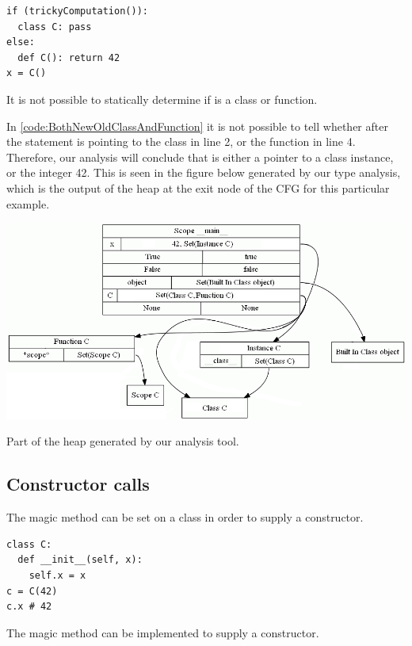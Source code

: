 \begin{listing}[H]
	\begin{verbatim}
if (trickyComputation()):
  class C: pass
else:
  def C(): return 42
x = C()
	\end{verbatim}
	\caption{It is not possible to statically determine if  is a class or function.}
	\label{code:BothNewOldClassAndFunction}
\end{listing}

In \autoref{code:BothNewOldClassAndFunction} it is not possible to tell whether  after the  statement is pointing to the class in line 2, or the function in line 4. Therefore, our analysis will conclude that  is either a pointer to a class instance, or the integer 42. This is seen in the figure below generated by our type analysis, which is the output of the heap at the exit node of the CFG for this particular example.

\begin{listing}[H]
	\begin{center}
		\includegraphics[width=1\textwidth]{images/BothNewOldClassAndFunction.png}
	\end{center}
	\vspace{-10pt}
	\caption{Part of the heap generated by our analysis tool.}
	\label{fig:BothNewOldClassAndFunction}
\end{listing}


\subsection{Constructor calls}
\label{section:Constructor calls}
The magic method  can be set on a class in order to supply a constructor.

\begin{listing}[H]
	\begin{verbatim}
class C:
  def __init__(self, x):
    self.x = x
c = C(42)
c.x # 42
	\end{verbatim}
	\caption{The magic method  can be implemented to supply a constructor.}
	\label{code:InitConstructorClass}
\end{listing}

